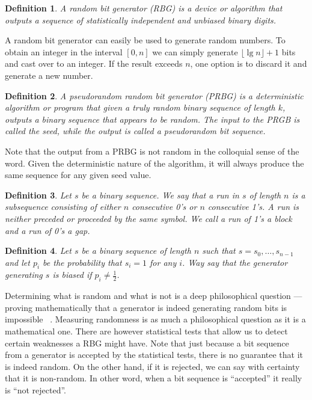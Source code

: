 \documentclass[a4paper]{article}           %
\newtheorem{mydef}{Definition}
\begin{document}
\begin{mydef}
A random bit generator (RBG) is a device or algorithm that outputs a sequence of statistically independent and unbiased binary digits.   
\end{mydef}

A random bit generator can easily be used to generate random numbers.  To obtain an integer in the interval $[0, n]$ we can simply generate $\lfloor \lg n \rfloor + 1$ bits and cast over to an integer. If the result exceeds $n$, one option is to discard it and generate a new number. 

\begin{mydef}
  
  A \emph{pseudorandom random bit generator} (PRBG) is a deterministic algorithm or program that given a truly random binary sequence of length $k$, outputs a binary sequence that appears to be random. The input to the PRGB is called the \emph{seed}, while the output is called a \emph{pseudorandom bit sequence}. 

  
\end{mydef}

Note that the output from a PRBG is not random in the colloquial sense of the word. Given the deterministic nature of the algorithm, it will always produce the same sequence for any given seed value. 

\begin{mydef}
Let $s$ be a binary sequence. We say that a \emph{run} in $s$ of length $n$ is a subsequence consisting of either $n$ consecutive 0's or $n$ consecutive 1's. A run is neither preceded or proceeded by the same symbol. We call a run of 1's a block and a run of 0's a gap. 
\end{mydef}

\begin{mydef}
  Let $s$ be a binary sequence of length $n$ such that $s = s_0, \ldots, s_{n-1}$ and let $p_i$ be the probability that $s_i = 1$ for any $i$. Way say that the generator generating $s$ is biased if $p_i \neq \frac 1 2$. 
\end{mydef}

Determining what is random and what is not is a deep philosophical question --- proving mathematically that a generator is indeed generating random bits is impossible ~\cite{menezes1996}. Measuring randomness is as much a philosophical question as it is a mathematical one. There are however statistical tests that allow us to detect certain weaknesses a RBG might have. Note that just because a bit sequence from a generator is accepted by the statistical tests, there is no guarantee that it is indeed random. On the other hand, if it is rejected, we can say with certainty that it is non-random. In other word, when a bit sequence is ``accepted'' it really is ``not rejected''. 
\end{document}
